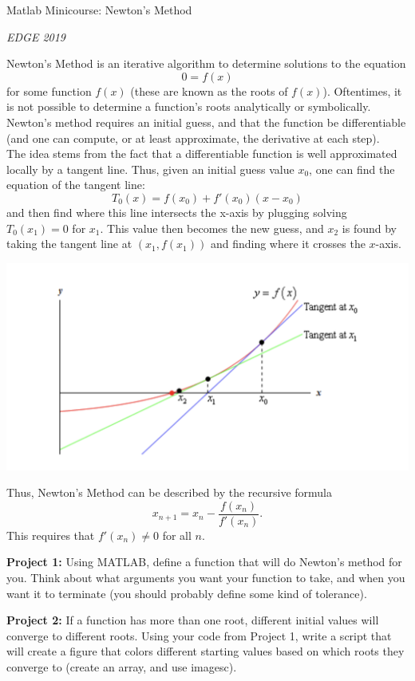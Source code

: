 \documentclass[12pt]{report}
\begin{document}
\centerline{Matlab Minicourse: Newton's Method}

\centerline{\it EDGE 2019}
Newton's Method is an iterative algorithm to determine solutions to the equation
$$0=f(x)$$
for some function $f(x)$ (these are known as the roots of $f(x)$).  Oftentimes, it is not possible to determine a function's roots analytically or symbolically.  Newton's method requires an initial guess, and that the function be differentiable (and one can compute, or at least approximate, the derivative at each step).  \\
The idea stems from the fact that a differentiable function is well approximated locally by a tangent line.  Thus, given an initial guess value $x_0$, one can find the equation of the tangent line:
$$T_0(x)=f(x_0)+f'(x_0)(x-x_0)$$
and then find where this line intersects the x-axis by plugging solving $T_0(x_1)=0$ for $x_1$.  This value then becomes the new guess, and $x_2$ is found by taking the tangent line at $(x_1,f(x_1))$ and finding where it crosses the $x$-axis.
\begin{center}
\includegraphics[scale=0.5]{newtonpic}
\end{center}
Thus, Newton's Method can be described by the recursive formula
$$x_{n+1}=x_n-\frac{f(x_n)}{f'(x_n)}.$$
This requires that $f'(x_n)\neq 0$ for all $n$. \\
\vspace{2mm}

\textbf{Project 1:} Using MATLAB, define a function that will do Newton's method for you.  Think about what arguments you want your function to take, and when you want it to terminate (you should probably define some kind of tolerance).  
\vspace{2mm}

\textbf{Project 2:} If a function has more than one root, different initial values will converge to different roots.  Using your code from Project 1, write a script that will create a figure that colors different starting values based on which roots they converge to (create an array, and use imagesc).
\end{document}
